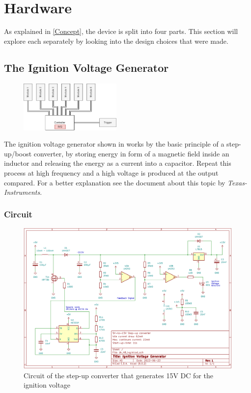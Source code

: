 \section{Hardware}
\label{Hardware}

As explained in \cref{Concept}, the device is split into four parts. This section will explore each separately by looking into the design choices that were made. 


\subsection{The Ignition Voltage Generator}
\label{Ignition Voltage Generator}

\begin{figure}[!ht]
    \centering
    \includegraphics[width=5cm]{./Figures/concept_ivg.png} 
\end{figure}

\noindent The ignition voltage generator shown in  works by the basic principle of a step-up/boost converter, by storing energy in form of a magnetic field inside an inductor and releasing the energy as a current into a capacitor. Repeat this process at high frequency and a high voltage is produced at the output compared. For a better explanation see the document about this topic by \textit{Texas-Instruments}.


\subsubsection{Circuit}

\begin{figure}[!ht]
    \centering
    \includegraphics[width=15cm]{./Figures/ivg_circuit.png}
    \caption{Circuit of the step-up converter that generates 15V DC for the ignition voltage}
    \label{fig:ivg_circuit}     
\end{figure}

